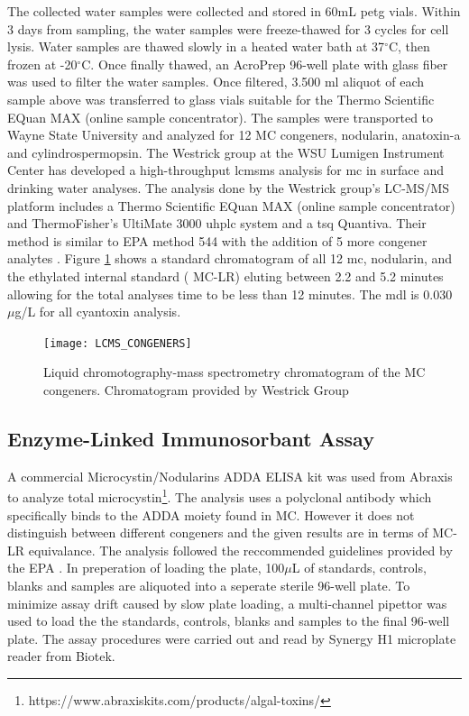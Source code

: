 The collected water samples were collected and stored in 60mL \gls{petg} vials. Within 3 days from sampling, the water samples were freeze-thawed for 3 cycles for cell lysis. Water samples are thawed slowly in a heated water bath at 37$^\circ$C, then frozen at -20$^\circ$C. Once finally thawed, an AcroPrep 96-well plate with glass fiber was used to filter the water samples. Once filtered, 3.500 ml aliquot of each sample above was transferred to glass vials suitable for the Thermo Scientific EQuan MAX (online sample concentrator). The samples were transported to Wayne State University and analyzed for 12 MC congeners, nodularin, anatoxin-a and cylindrospermopsin.  The Westrick group at the WSU Lumigen Instrument Center has developed a high-throughput \gls{lcmsms} analysis for \gls{mc} in surface and drinking water analyses.
The analysis done by the Westrick group's LC-MS/MS platform includes a Thermo Scientific EQuan MAX (online sample concentrator) and ThermoFisher’s UltiMate 3000 \gls{uhplc} system and a \gls{tsq} Quantiva.
Their method is similar to EPA method 544 with the addition of 5 more congener analytes \cite{shoemaker_method_2015}. Figure \ref{fig:spectra} shows a standard chromatogram of all 12 \gls{mc}, nodularin, and the ethylated internal standard (\ch{[C_2D_5]} MC-LR) eluting between 2.2 and 5.2 minutes allowing for the total analyses time to be less than 12 minutes.  The \gls{mdl} is 0.030  $\mu$g/L  for all cyantoxin analysis. 

\begin{figure}[!h]
\centering
\texttt{[image: LCMS\_CONGENERS]}
\caption{Liquid chromotography-mass spectrometry chromatogram of the MC congeners. Chromatogram provided by Westrick Group}
\label{fig:spectra}
\end{figure}

\clearpage

\subsection{Enzyme-Linked Immunosorbant Assay}

A commercial Microcystin/Nodularins ADDA ELISA kit was used from Abraxis to analyze total microcystin\footnote{https://www.abraxiskits.com/products/algal-toxins/}. The analysis uses a polyclonal antibody which specifically binds to the ADDA moiety found in MC. However it does not distinguish between different congeners and the given results are in terms of MC-LR equivalance. The analysis followed the reccommended guidelines provided by the EPA \cite{usepa_method_2016}. In preperation of loading the plate,  100$\mu$L of standards, controls, blanks and samples are aliquoted into a seperate sterile 96-well plate. To minimize assay drift caused by slow plate loading, a multi-channel pipettor was used to load the the standards, controls, blanks and samples to the final 96-well plate. The assay procedures were carried out and read by Synergy H1 microplate reader from Biotek.

